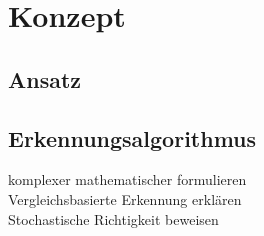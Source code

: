 \chapter{Konzept}\label{ch:konzept}
\section{Ansatz}
\section{Erkennungsalgorithmus}

komplexer mathematischer formulieren\\
Vergleichsbasierte Erkennung erklären\\
Stochastische Richtigkeit beweisen\\


\begin{deprecated}
\cite{davis93}


\end{deprecated}
